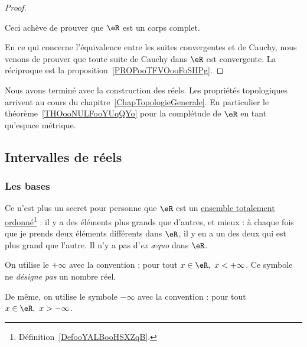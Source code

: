 \begin{proof}
\begin{subproof}
        Ceci achève de prouver que \( \eR\) est un corps complet.
        \end{subproof}

        En ce qui concerne l'équivalence entre les suites convergentes et de Cauchy, nous venons de prouver que toute suite de Cauchy dans \( \eR\) est convergente. La réciproque est la proposition~\ref{PROPooTFVOooFoSHPg}.

\end{proof}

Nous avons terminé avec la construction des réels. Les propriétés topologiques arrivent au cours du chapitre~\ref{ChapTopologieGenerale}. En particulier le théorème~\ref{THOooNULFooYUqQYo} pour la complétude de \( \eR\) en tant qu'espace métrique.

\subsection{Intervalles de réels}

\subsubsection{Les bases}

Ce n'est plus un secret pour personne que $\eR$ est un \href{http://fr.wikipedia.org/wiki/Relation_d'ordre}{ensemble totalement ordonné}\footnote{Définition~\ref{DefooYALBooHSXZqB}.} : il y a des éléments plus grands que d'autres, et mieux : à chaque fois que je prends deux éléments différents dans $\eR$, il y en a un des deux qui est plus grand que l'autre. Il n'y a pas d'\emph{ex æquo} dans $\eR$.

\begin{definition}[Infinis]
  On utilise le  \( + \infty \) avec la convention : pour tout \( x \in \eR,\ x < + \infty \). Ce symbole ne \emph{désigne pas} un nombre réel.

  De même, on utilise le symbole \( - \infty \) avec la convention : pour tout \( x \in \eR,\ x > - \infty \).
\end{definition}

